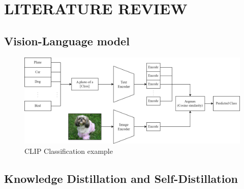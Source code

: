 \chapter{LITERATURE REVIEW}

\section{Vision-Language model}


\begin{figure}[h]
    \caption{CLIP Classification example}
    \label{fig:clip_classification}
    \centering
    \includegraphics[width=1\textwidth]{Images/CLIPClassification.png}
    \small
\end{figure}

\section{Knowledge Distillation and Self-Distillation}
